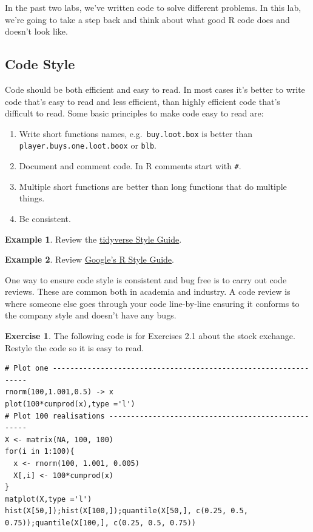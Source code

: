 \documentclass[
]{book}
\providecommand{\tightlist}{%
  \setlength{\itemsep}{0pt}\setlength{\parskip}{0pt}}
\theoremstyle{definition}
\theoremstyle{definition}
\newtheorem{example}{Example}[chapter]
\theoremstyle{definition}
\newtheorem{exercise}{Exercise}[chapter]
\theoremstyle{definition}
\theoremstyle{remark}
\begin{document}
In the past two labs, we've written code to solve different problems. In this lab, we're going to take a step back and think about what good R code does and doesn't look like.

\hypertarget{code-style}{%
\subsection{Code Style}\label{code-style}}

Code should be both efficient and easy to read. In most cases it's better to write code that's easy to read and less efficient, than highly efficient code that's difficult to read. Some basic principles to make code easy to read are:

\begin{enumerate}
\def\labelenumi{\arabic{enumi}.}
\tightlist
\item
  Write short functions names, e.g.~\texttt{buy.loot.box} is better than \texttt{player.buys.one.loot.boox} or \texttt{blb}.
\item
  Document and comment code. In R comments start with \texttt{\#}.
\item
  Multiple short functions are better than long functions that do multiple things.
\item
  Be consistent.
\end{enumerate}

\begin{example}
Review the \href{https://style.tidyverse.org/index.html}{tidyverse Style Guide}.
\end{example}

\begin{example}
Review \href{https://google.github.io/styleguide/Rguide.html}{Google's R Style Guide}.
\end{example}

One way to ensure code style is consistent and bug free is to carry out code reviews. These are common both in academia and industry. A code review is where someone else goes through your code line-by-line ensuring it conforms to the company style and doesn't have any bugs.

\begin{exercise}

The following code is for Exercises 2.1 about the stock exchange. Restyle the code so it is easy to read.

\begin{verbatim}
# Plot one ----------------------------------------------------------------
rnorm(100,1.001,0.5) -> x 
plot(100*cumprod(x),type ='l') 
# Plot 100 realisations ---------------------------------------------------
X <- matrix(NA, 100, 100) 
for(i in 1:100){
  x <- rnorm(100, 1.001, 0.005)
  X[,i] <- 100*cumprod(x)
}
matplot(X,type ='l')
hist(X[50,]);hist(X[100,]);quantile(X[50,], c(0.25, 0.5, 0.75));quantile(X[100,], c(0.25, 0.5, 0.75))
\end{verbatim}

\end{exercise}
\end{document}
